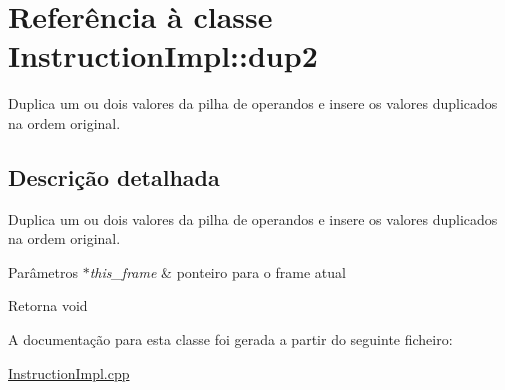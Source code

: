 \hypertarget{class_instruction_impl_1_1dup2}{}\section{Referência à classe Instruction\+Impl\+:\+:dup2}
\label{class_instruction_impl_1_1dup2}


Duplica um ou dois valores da pilha de operandos e insere os valores duplicados na ordem original.  




\subsection{Descrição detalhada}
Duplica um ou dois valores da pilha de operandos e insere os valores duplicados na ordem original. 


\begin{DoxyParams}{Parâmetros}
{\em $\ast$this\+\_\+frame} & ponteiro para o frame atual \\
\hline
\end{DoxyParams}
\begin{DoxyReturn}{Retorna}
void 
\end{DoxyReturn}


A documentação para esta classe foi gerada a partir do seguinte ficheiro\+:\begin{DoxyCompactItemize}
\item 
\hyperlink{_instruction_impl_8cpp}{Instruction\+Impl.\+cpp}\end{DoxyCompactItemize}
